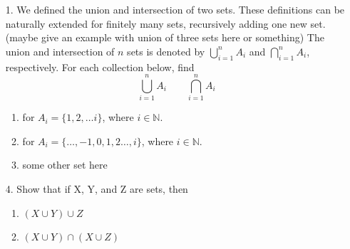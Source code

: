 \begin{enumerate}
    \item[1.]
    We defined the union and intersection of two sets. These definitions can be naturally extended for finitely many sets, recursively adding one new set. (maybe give an example with union of three sets here or something) The union and intersection of $n$ sets is denoted by $\bigcup_{i = 1}^{n} A_{i}$ and $\bigcap_{i = 1}^{n} A_{i}$, respectively.
    For each collection below, find $$\bigcup_{i = 1}^{n} A_{i} \qquad \bigcap_{i = 1}^{n} A_{i}$$
    \begin{enumerate}
        \item for $A_{i} = \{1, 2, \dots i\}$, where $i \in \mathbb{N}$.
        \item for $A_{i} = \{\dots, -1, 0, 1, 2 \dots, i\}$, where $i \in \mathbb{N}$.
        \item some other set here
    \end{enumerate}
    \begin{solutiondraft}
            

    \end{solutiondraft}
    \begin{comment}
        here is where you type in your explain.
    \end{comment}





    \item[4.] 
    Show that if X, Y, and Z are sets, then
        \begin{enumerate}
            \item $(X \cup Y) \cup Z$
            \item $(X \cup Y) \cap (X \cup Z)$
        \end{enumerate}
        
    \begin{solutiondraft}


\end{solutiondraft}
\end{enumerate}
